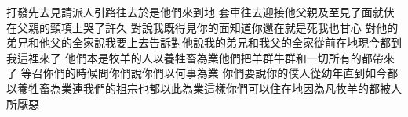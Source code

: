 打發先去見\chientien 請派人引路往去\yuentien 於是他們來到地\chuan 
{}套車往去\chientien 迎接他父親\yuentien 及至見了面\chientien 就伏在父親的頸項上\chientien 哭了許久\chuan 
{}對說\chientien 我既得見你的面\chientien 知道你還在\chientien 就是死我也甘心\chuan 
{}對他的弟兄\chientien 和他父的全家說\chientien 我要上去告訴\chientien 對他說\chientien 我的弟兄和我父的全家\chientien 從前在地\chientien 現今都到我這裡來了\chuan 
{}他們本是牧羊的人\chientien 以養牲畜為業\chientien 他們把羊群\chientien 牛群\chientien 和一切所有的都帶來了\chuan 
{}等召你們的時候\chientien 問你們說\chientien 你們以何事為業\chientien 
{}你們要說\chientien 你的僕人從幼年直到如今\chientien 都以養牲畜為業\chientien 連我們的祖宗也都以此為業\chuan 這樣\chientien 你們可以住在地\chientien 因為凡牧羊的都被人所厭惡\chuan 

